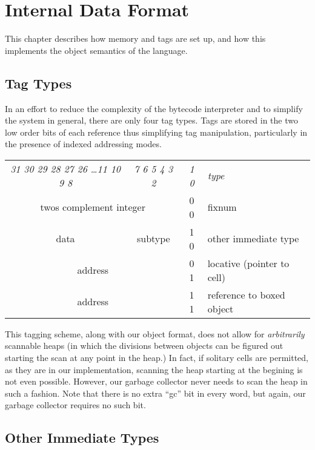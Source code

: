 \chapter{Internal Data Format}

This chapter describes how memory and tags are set up, and how this
implements the object semantics of the language.

\section{Tag Types} \label{immtags}

In an effort to reduce the complexity of the bytecode interpreter and
to simplify the system in general, there are only four tag types.
Tags are stored in the two low order bits of each reference thus
simplifying tag manipulation, particularly in the presence of indexed
addressing modes.

\begin{center}
\begin{tabular}{|c|c|c|l}
\cline{1-3}
\em 31 30 29 28 27 26 \ldots 11 10 9 8 & \em 7 6 5 4 3 2 & \em 1 0 &
 \multicolumn{1}{l}{\em type} \\ \cline{1-3}
\multicolumn{2}{|c|}{twos complement integer} & 0 0 & fixnum \\ \cline{1-3}
data	&	subtype		& 1 0 & other immediate type \\ \cline{1-3}
\multicolumn{2}{|c|}{address}	& 0 1 & locative (pointer to cell) \\ \cline{1-3}
\multicolumn{2}{|c|}{address}	& 1 1 & reference to boxed object \\ \cline{1-3}
\end{tabular}
\end{center}

This tagging scheme, along with our object format, does not allow for
{\em arbitrarily} scannable heaps (in which the divisions between
objects can be figured out starting the scan at any point in the
heap.)  In fact, if solitary cells are permitted, as they are in our
implementation, scanning the heap starting at the begining is not even
possible.  However, our garbage collector never needs to scan the heap
in such a fashion.  Note that there is no extra ``gc'' bit in every
word, but again, our garbage collector requires no such bit.


\section{Other Immediate Types}

